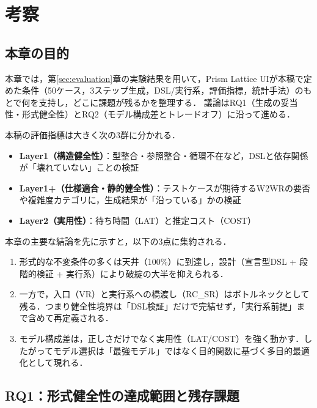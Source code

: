 \documentclass[a4paper,10pt]{jarticle}
\begin{document}
\section{考察}
\label{sec:discussion}

\subsection{本章の目的}
\label{subsec:disc_intro}

本章では，第\ref{sec:evaluation}章の実験結果を用いて，Prism Lattice UIが本稿で定めた条件（50ケース，3ステップ生成，DSL/実行系，評価指標，統計手法）のもとで何を支持し，どこに課題が残るかを整理する．
議論はRQ1（生成の妥当性・形式健全性）とRQ2（モデル構成差とトレードオフ）に沿って進める．

本稿の評価指標は大きく次の3群に分かれる．
\begin{itemize}
\item \textbf{Layer1（構造健全性）}：型整合・参照整合・循環不在など，DSLと依存関係が「壊れていない」ことの検証
\item \textbf{Layer1+（仕様適合・静的健全性）}：テストケースが期待するW2WRの要否や複雑度カテゴリに，生成結果が「沿っている」かの検証
\item \textbf{Layer2（実用性）}：待ち時間（LAT）と推定コスト（COST）
\end{itemize}

本章の主要な結論を先に示すと，以下の3点に集約される．
\begin{enumerate}
\item 形式的な不変条件の多くは天井（100\%）に到達し，設計（宣言型DSL + 段階的検証 + 実行系）により破綻の大半を抑えられる．
\item 一方で，入口（VR）と実行系への橋渡し（RC\_SR）はボトルネックとして残る．つまり健全性境界は「DSL検証」だけで完結せず，「実行系前提」まで含めて再定義される．
\item モデル構成差は，正しさだけでなく実用性（LAT/COST）を強く動かす．したがってモデル選択は「最強モデル」ではなく目的関数に基づく多目的最適化として現れる．
\end{enumerate}

\subsection{RQ1：形式健全性の達成範囲と残存課題}
\label{subsec:disc_rq1}
\end{document}

